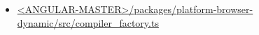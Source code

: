 

\begin{itemize}
  \item \href{https://github.com/angular/angular/tree/master/packages/platform-browser-dynamic/src/compiler_factory.ts}
        {<ANGULAR-MASTER>/packages/platform-browser-dynamic/src/compiler\_factory.ts}
\end{itemize}

